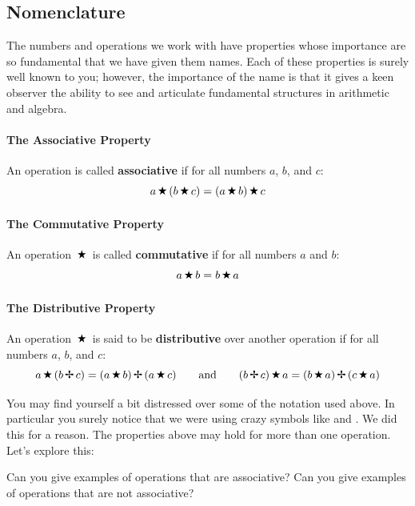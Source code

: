 \subsection{Nomenclature}

The numbers and operations we work with have properties whose
importance are so fundamental that we have given them names. Each of
these properties is surely well known to you; however, the importance
of the name is that it gives a keen observer the ability to see and
articulate fundamental structures in arithmetic and algebra.

\paragraph{The Associative Property} 
An operation  is called \textbf{associative} if for all
numbers $a$, $b$, and $c$:
\[
a \,\text{\ding{72}}\, (b \,\text{\ding{72}}\, c) = (a \,\text{\ding{72}}\, b) \,\text{\ding{72}}\, c
\]


\paragraph{The Commutative Property}
An operation $\,\text{\ding{72}}\,$ is called \textbf{commutative} if for all
numbers $a$ and $b$:
\[
a \,\text{\ding{72}}\, b = b \,\text{\ding{72}}\, a
\]

\paragraph{The Distributive Property}
An operation $\,\text{\ding{72}}\,$ is said to be \textbf{distributive} over another
operation  if for all numbers $a$, $b$, and $c$:
\[
a \,\text{\ding{72}}\,(b \,\text{\ding{66}}\, c)  = (a \,\text{\ding{72}}\, b) \,\text{\ding{66}}\, (a\,\text{\ding{72}}\, c)
\qquad\text{and}\qquad (b \,\text{\ding{66}}\, c)\,\text{\ding{72}}\, a  = (b \,\text{\ding{72}}\, a) \,\text{\ding{66}}\, (c\,\text{\ding{72}}\, a)
\]

You may find yourself a bit distressed over some of the notation used
above. In particular you surely notice that we were using crazy
symbols like  and . We did this for a reason. The
properties above may hold for more than one operation. Let's explore
this:

\begin{question}
Can you give examples of operations that are associative? Can you give
examples of operations that are not associative?
\end{question}
\QM

